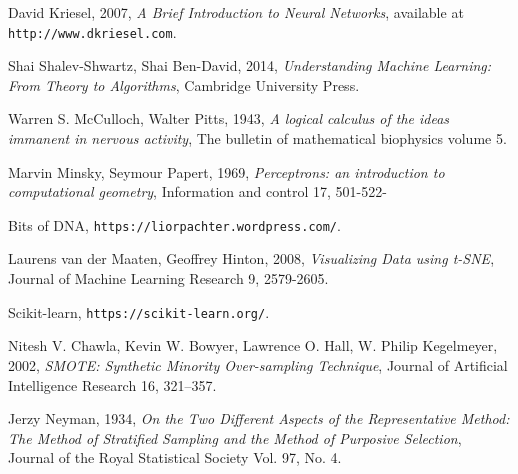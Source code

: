 \documentclass[12pt, twoside, letterpaper]{report}
\begin{document}
	\begin{thebibliography}{9}
		 David Kriesel, 2007, \textit{A Brief Introduction to Neural Networks}, available at \texttt{http://www.dkriesel.com}.

		 Shai Shalev-Shwartz, Shai Ben-David, 2014, \textit{Understanding Machine Learning: From Theory to Algorithms}, Cambridge University Press.
		
		 Warren S. McCulloch, Walter Pitts, 1943, \textit{A logical calculus of the ideas immanent in nervous activity}, The bulletin of mathematical biophysics volume 5.		
		
		 Marvin Minsky, Seymour Papert, 1969,  \textit{Perceptrons: an introduction to computational geometry}, Information and control 17, 501-522- 
		
		 Bits of DNA, \texttt{https://liorpachter.wordpress.com/}.
		
		 Laurens van der Maaten, Geoffrey Hinton, 2008, \textit{Visualizing Data using t-SNE}, Journal of Machine Learning Research 9, 2579-2605.
		
		 Scikit-learn, \texttt{https://scikit-learn.org/}.
		
		 Nitesh V. Chawla, Kevin W. Bowyer, Lawrence O. Hall, W. Philip Kegelmeyer, 2002, \textit{SMOTE: Synthetic Minority Over-sampling Technique}, Journal of Artificial Intelligence Research 16, 321–357.
		
		 Jerzy Neyman, 1934, \textit{On the Two Different Aspects of the Representative Method: The Method of Stratified Sampling and the Method of Purposive Selection}, Journal of the Royal Statistical Society Vol. 97, No. 4.
		
	\end{thebibliography}
	
\end{document}
